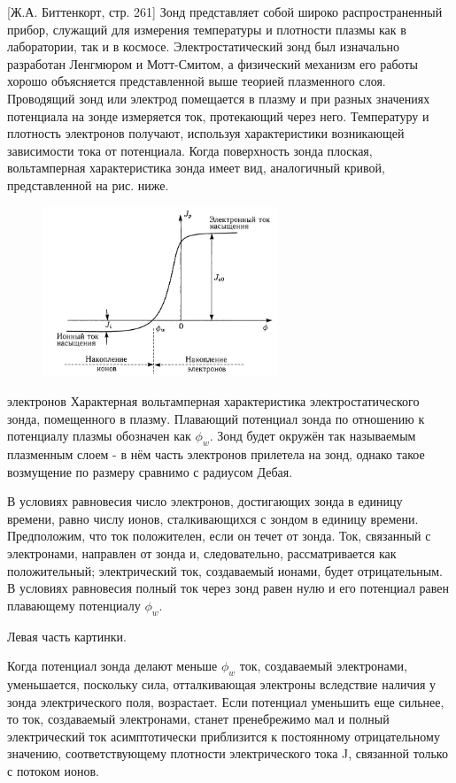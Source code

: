 \documentclass[10pt, a4paper]{article}
\begin{document}
[Ж.А. Биттенкорт, стр. 261]
Зонд представляет собой широко распространенный прибор,  
служащий для измерения температуры и плотности плазмы как в  
лаборатории, так и в космосе. Электростатический зонд был изначально разработан Ленгмюром и Мотт-Смитом, а физический механизм его работы хорошо объясняется представленной выше теорией плазменного слоя. 
Проводящий зонд или электрод помещается в плазму и при разных 
значениях потенциала на зонде измеряется ток, протекающий через 
него. Температуру и плотность электронов получают, используя  
характеристики возникающей зависимости тока от потенциала. Когда поверхность зонда плоская, вольтамперная характеристика зонда имеет вид, аналогичный кривой, представленной на рис. ниже.
\begin{figure}[ht]
	\begin{center}
		\includegraphics[width=70mm]{VaH_zonda.JPG}
	\end{center}
\end{figure}
электронов 
Характерная вольтамперная характеристика электростатического зонда, помещенного в плазму. Плавающий потенциал зонда по отношению к потенциалу плазмы обозначен как $\phi_w$.
Зонд будет окружён так называемым плазменным слоем - в нём часть электронов прилетела на зонд, однако такое возмущение по размеру сравнимо с радиусом Дебая. 

В условиях равновесия число электронов, достигающих зонда в единицу времени, равно числу ионов, сталкивающихся с зондом в единицу времени. Предположим, что ток положителен, если 
он течет от зонда. Ток, связанный с электронами, направлен от зонда и, следовательно, рассматривается как положительный; электрический ток, создаваемый ионами, будет отрицательным. В условиях равновесия полный ток через зонд равен нулю и его потенциал равен плавающему потенциалу $\phi_w$.

Левая часть картинки.

Когда потенциал зонда делают меньше $\phi_w$ ток, 
создаваемый электронами, уменьшается, поскольку сила,  
отталкивающая электроны вследствие наличия у зонда электрического поля, возрастает. Если потенциал уменьшить еще сильнее, то ток, создаваемый электронами, станет пренебрежимо мал и полный электрический ток асимптотически приблизится к постоянному отрицательному значению, соответствующему плотности электрического тока J, связанной только с потоком ионов. 
\end{document}
